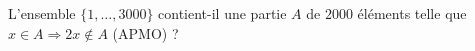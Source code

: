 L'ensemble $\{1, \ldots, 3000\}$ contient-il une partie $A$ de $2000$ éléments telle que $x \in A \Rightarrow 2x \notin A$ (APMO) ?
